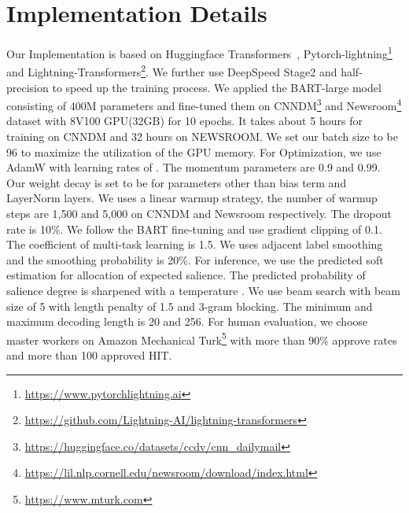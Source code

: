 \documentclass[11pt]{article}
\begin{document}
\section{Implementation Details}
\label{sec:appendix_implementation}
Our Implementation is based on Huggingface Transformers~\cite{wolf-etal-2020-transformers}, Pytorch-lightning\footnote{\url{https://www.pytorchlightning.ai}} and Lightning-Transformers\footnote{\url{https://github.com/Lightning-AI/lightning-transformers}}. We further use DeepSpeed \cite{rasley2020deepspeed} Stage2 and half-precision to speed up the training process.
We applied the BART-large model consisting of 400M parameters and fine-tuned them on CNNDM\footnote{\url{https://huggingface.co/datasets/ccdv/cnn_dailymail}} and Newsroom\footnote{\url{https://lil.nlp.cornell.edu/newsroom/download/index.html}} dataset with 8V100 GPU(32GB) for 10 epochs. It takes about 5 hours for training on CNNDM and 32 hours on NEWSROOM.
We set our batch size to be 96 to maximize the utilization of the GPU memory.
For Optimization, we use AdamW \cite{loshchilov2018decoupled} with learning rates of .
The momentum parameters are 0.9 and 0.99.
Our weight decay is set to be  for parameters other than bias term and LayerNorm layers.
We uses a linear warmup strategy, the number of warmup steps are 1,500 and 5,000 on CNNDM and Newsroom respectively.
The dropout rate is 10\%.
We follow the BART \cite{lewis2020bart} fine-tuning and use gradient clipping of 0.1.
The coefficient of multi-task learning  is 1.5.
We uses adjacent label smoothing and the smoothing probability  is 20\%.
For inference, we use the predicted soft estimation for allocation of expected salience.
The predicted probability of salience degree is sharpened with a temperature .
We use beam search with beam size of 5 with length penalty of 1.5 and 3-gram blocking.
The minimum and maximum decoding length is 20 and 256.
For human evaluation, we choose master workers on Amazon Mechanical Turk\footnote{\url{https://www.mturk.com}} with
more than 90\% approve rates and more than 100 approved HIT.

 
\end{document}
